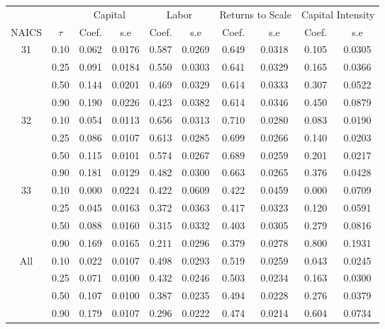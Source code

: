 \begin{table}[H]
\centering
\begin{tabular}{cccccccccc}
  \hline\hline & & \multicolumn{2}{c}{Capital}  & \multicolumn{2}{c}{Labor} & \multicolumn{2}{c}{Returns to Scale} & \multicolumn{2}{c}{Capital Intensity}\\ \cmidrule(lr){3-4} \cmidrule(lr){5-6} \cmidrule(lr){7-8} \cmidrule(lr){9-10}NAICS & $\tau$ & Coef. & s.e & Coef. & s.e & Coef. & s.e & Coef. & s.e \\ 
  \hline
31 & 0.10 & 0.062 & 0.0176 & 0.587 & 0.0269 & 0.649 & 0.0318 & 0.105 & 0.0305 \\ 
   & 0.25 & 0.091 & 0.0184 & 0.550 & 0.0303 & 0.641 & 0.0329 & 0.165 & 0.0366 \\ 
   & 0.50 & 0.144 & 0.0201 & 0.469 & 0.0329 & 0.614 & 0.0333 & 0.307 & 0.0522 \\ 
   & 0.90 & 0.190 & 0.0226 & 0.423 & 0.0382 & 0.614 & 0.0346 & 0.450 & 0.0879 \\ 
  32 & 0.10 & 0.054 & 0.0113 & 0.656 & 0.0313 & 0.710 & 0.0280 & 0.083 & 0.0190 \\ 
   & 0.25 & 0.086 & 0.0107 & 0.613 & 0.0285 & 0.699 & 0.0266 & 0.140 & 0.0203 \\ 
   & 0.50 & 0.115 & 0.0101 & 0.574 & 0.0267 & 0.689 & 0.0259 & 0.201 & 0.0217 \\ 
   & 0.90 & 0.181 & 0.0129 & 0.482 & 0.0300 & 0.663 & 0.0265 & 0.376 & 0.0428 \\ 
  33 & 0.10 & 0.000 & 0.0224 & 0.422 & 0.0609 & 0.422 & 0.0459 & 0.000 & 0.0709 \\ 
   & 0.25 & 0.045 & 0.0163 & 0.372 & 0.0363 & 0.417 & 0.0323 & 0.120 & 0.0591 \\ 
   & 0.50 & 0.088 & 0.0160 & 0.315 & 0.0332 & 0.403 & 0.0305 & 0.279 & 0.0816 \\ 
   & 0.90 & 0.169 & 0.0165 & 0.211 & 0.0296 & 0.379 & 0.0278 & 0.800 & 0.1931 \\ 
  All & 0.10 & 0.022 & 0.0107 & 0.498 & 0.0293 & 0.519 & 0.0259 & 0.043 & 0.0245 \\ 
   & 0.25 & 0.071 & 0.0100 & 0.432 & 0.0246 & 0.503 & 0.0234 & 0.163 & 0.0300 \\ 
   & 0.50 & 0.107 & 0.0100 & 0.387 & 0.0235 & 0.494 & 0.0228 & 0.276 & 0.0379 \\ 
   & 0.90 & 0.179 & 0.0107 & 0.296 & 0.0222 & 0.474 & 0.0214 & 0.604 & 0.0734 \\ 
   \hline
\end{tabular}
\end{table}
